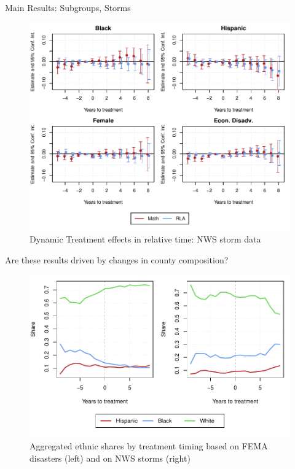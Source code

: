 \documentclass[hyperref={colorlinks = true,linkcolor = blue, citecolor=blue,urlcolor=blue}]{beamer}
\begin{document}
\begin{frame}{Main Results: Subgroups, Storms}
	\begin{figure}[!h]
		\centering
		\includegraphics[scale=0.6]{"../Code & Data/ResultsPlotStormsPresentationSubgroups.pdf"}
		\caption{Dynamic Treatment effects in relative time: NWS storm data}
	\end{figure}
\end{frame}


\begin{frame}{Are these results driven by changes in county composition?}
	
	\begin{figure}[!h]
		\centering
		\includegraphics[scale=0.6]{"../Code & Data/EthnicComposition.pdf"}
		\caption{Aggregated ethnic shares by treatment timing based on FEMA disasters (left) and on NWS storms (right)}
		\label{EthnicComposition}
	\end{figure}
\end{frame}
\end{document}
